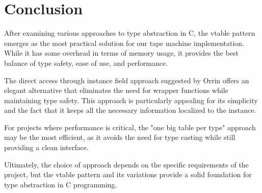 \documentclass[11pt]{article}
\begin{document}
\section{Conclusion}
\label{sec:org1380bd0}

After examining various approaches to type abstraction in C, the vtable pattern emerges as the most practical solution for our tape machine implementation. While it has some overhead in terms of memory usage, it provides the best balance of type safety, ease of use, and performance.

The direct access through instance field approach suggested by Orrin offers an elegant alternative that eliminates the need for wrapper functions while maintaining type safety. This approach is particularly appealing for its simplicity and the fact that it keeps all the necessary information localized to the instance.

For projects where performance is critical, the "one big table per type" approach may be the most efficient, as it avoids the need for type casting while still providing a clean interface.

Ultimately, the choice of approach depends on the specific requirements of the project, but the vtable pattern and its variations provide a solid foundation for type abstraction in C programming.
\end{document}
